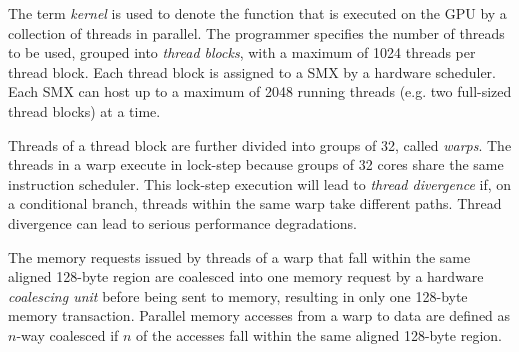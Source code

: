 The term \emph{kernel} is used to denote the function that is executed on the 
GPU by a collection of threads in parallel.
The programmer specifies the number of threads to be used,
grouped into {\it thread blocks}, with a maximum
of 1024 threads per thread block.
Each thread block is assigned to a SMX by a hardware scheduler. 
Each SMX can host up to a maximum of 2048 running threads (e.g. two full-sized thread blocks) at a time.

Threads of a thread block are further divided into groups of 32, called \emph{warps}. 
The threads in a warp execute in lock-step 
because groups of 32 cores share the same instruction scheduler.
This lock-step execution will lead to {\it thread divergence} if,
on a conditional branch, threads within the same warp take different paths.
Thread divergence can lead to serious performance degradations. 

The memory requests issued by threads of a warp that fall within the same aligned 128-byte region are
coalesced into one memory request by a hardware \emph{coalescing unit} before being sent to memory, resulting in only one 128-byte memory transaction. 
Parallel memory accesses from a warp to data are defined as $n$-way coalesced if $n$ of the accesses fall
within the same aligned 128-byte region.




